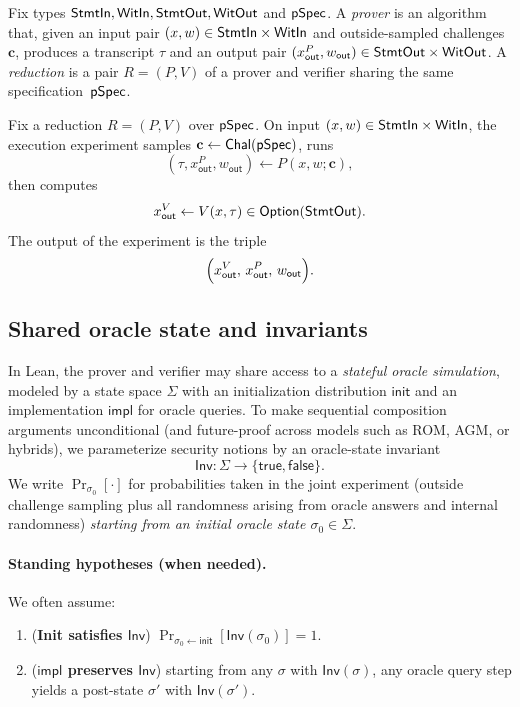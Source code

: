 \begin{definition}
Fix types $\mathsf{StmtIn},\mathsf{WitIn},\mathsf{StmtOut},\mathsf{WitOut}$ and $\mathsf{pSpec}$. A \emph{prover} is an algorithm that, given
an input pair $(x,w) \in \mathsf{StmtIn} \times \mathsf{WitIn}$ and outside-sampled challenges $\mathbf{c}$, produces
a transcript $\tau$ and an output pair $(x^P_{\mathsf{out}}, w_{\mathsf{out}}) \in \mathsf{StmtOut} \times
\mathsf{WitOut}$. A \emph{reduction} is a pair $R = (P,V)$ of a prover and verifier sharing the same
specification~$\mathsf{pSpec}$.
\end{definition}

\begin{definition}
Fix a reduction $R=(P,V)$ over $\mathsf{pSpec}$. On input $(x,w) \in \mathsf{StmtIn}\times\mathsf{WitIn}$, the execution
experiment samples $\mathbf{c} \gets \mathsf{Chal}(\mathsf{pSpec})$, runs
\[
  (\tau, x^P_{\mathsf{out}}, w_{\mathsf{out}}) \gets P(x,w;\mathbf{c}),
\]
then computes
\[
  x^V_{\mathsf{out}} \gets V(x,\tau) \in \mathsf{Option}(\mathsf{StmtOut}).
\]
The output of the experiment is the triple
\[
  \Bigl(x^V_{\mathsf{out}},\, x^P_{\mathsf{out}},\, w_{\mathsf{out}}\Bigr).
\]
\end{definition}

\subsection{Shared oracle state and invariants}

In Lean, the prover and verifier may share access to a \emph{stateful oracle simulation}, modeled by
a state space $\Sigma$ with an initialization distribution $\mathsf{init}$ and an implementation
$\mathsf{impl}$ for oracle queries. To make sequential composition arguments unconditional (and
future-proof across models such as ROM, AGM, or hybrids), we parameterize security notions by an
oracle-state invariant
\[
  \mathsf{Inv} : \Sigma \to \{\mathsf{true},\mathsf{false}\}.
\]
We write $\Pr_{\sigma_0}[\cdot]$ for probabilities taken in the joint experiment (outside challenge
sampling plus all randomness arising from oracle answers and internal randomness) \emph{starting from
an initial oracle state $\sigma_0 \in \Sigma$}.

\paragraph{Standing hypotheses (when needed).}
We often assume:
\begin{enumerate}
  \item (\textbf{Init satisfies $\mathsf{Inv}$}) $\Pr_{\sigma_0\gets\mathsf{init}}[\mathsf{Inv}(\sigma_0)] = 1$.
  \item (\textbf{$\mathsf{impl}$ preserves $\mathsf{Inv}$}) starting from any $\sigma$ with $\mathsf{Inv}(\sigma)$,
  any oracle query step yields a post-state $\sigma'$ with $\mathsf{Inv}(\sigma')$.
\end{enumerate}

